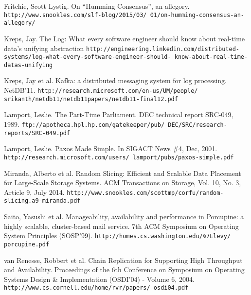\documentclass[preprint,10pt]{sigplanconf}
\begin{document}
\begin{thebibliography}{}
Fritchie, Scott Lystig.
On “Humming Consensus”, an allegory.
{\tt http://www.snookles.com/slf-blog/2015/03/ 01/on-humming-consensus-an-allegory/}

Kreps, Jay.
The Log: What every software engineer should know about real-time data's unifying abstraction
{\tt http://engineering.linkedin.com/distributed-
  systems/log-what-every-software-engineer-should-
  know-about-real-time-datas-unifying}

Kreps, Jay et al.
Kafka: a distributed messaging system for log processing.
NetDB’11.
{\tt http://research.microsoft.com/en-us/UM/people/
  srikanth/netdb11/netdb11papers/netdb11-final12.pdf}

Lamport, Leslie.
The Part-Time Parliament.
DEC technical report SRC-049, 1989.
{\tt ftp://apotheca.hpl.hp.com/gatekeeper/pub/ DEC/SRC/research-reports/SRC-049.pdf}

Lamport, Leslie.
Paxos Made Simple.
In SIGACT News \#4, Dec, 2001.
{\tt http://research.microsoft.com/users/ lamport/pubs/paxos-simple.pdf}

Miranda, Alberto et al.
Random Slicing: Efficient and Scalable Data Placement for Large-Scale Storage Systems.
ACM Transactions on Storage, Vol. 10, No. 3, Article 9, July 2014.
{\tt http://www.snookles.com/scottmp/corfu/random- slicing.a9-miranda.pdf}

Saito, Yasushi et al.
Manageability, availability and performance in Porcupine: a highly scalable, cluster-based mail service.
7th ACM Symposium on Operating System Principles (SOSP’99).
{\tt http://homes.cs.washington.edu/\%7Elevy/ porcupine.pdf}

van Renesse, Robbert et al.
Chain Replication for Supporting High Throughput and Availability.
Proceedings of the 6th Conference on Symposium on Operating Systems
Design \& Implementation (OSDI'04) - Volume 6, 2004.
{\tt http://www.cs.cornell.edu/home/rvr/papers/ osdi04.pdf}

\end{thebibliography}
\end{document}
